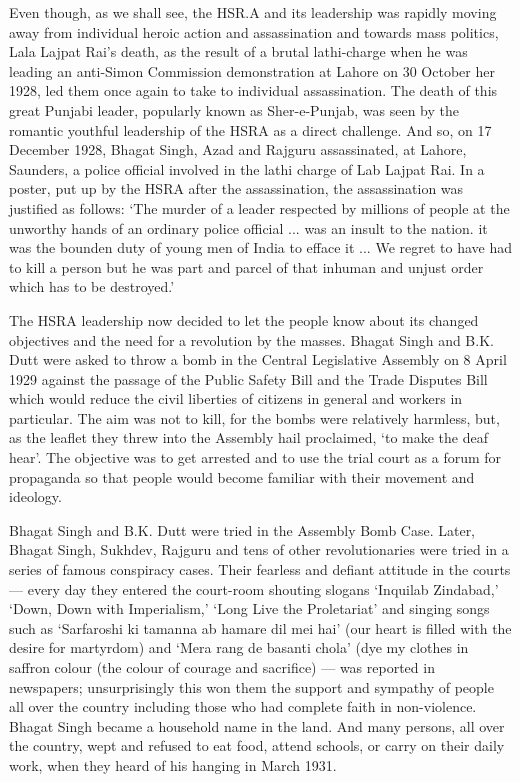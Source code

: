 Even though, as we shall see, the HSR.A and its leadership was rapidly moving away from individual heroic action and assassination and towards mass politics, Lala Lajpat Rai's death, as the result of a brutal lathi-charge when he was leading an anti-Simon Commission demonstration at Lahore on 30 October her 1928, led them once again to take to individual assassination. The death of this great Punjabi leader, popularly known as Sher-e-Punjab, was seen by the romantic youthful leadership of the HSRA as a direct challenge. And so, on 17 December 1928, Bhagat Singh, Azad and Rajguru assassinated, at Lahore, Saunders, a police official involved in the lathi charge of Lab Lajpat Rai. In a poster, put up by the HSRA after the assassination, the assassination was justified as follows: `The murder of a leader respected by millions of people at the unworthy hands of an ordinary police official ... was an insult to the nation. it was the bounden duty of young men of India to efface it ... We regret to have had to kill a person but he was part and parcel of that inhuman and unjust order which has to be destroyed.'

The HSRA leadership now decided to let the people know about its changed objectives and the need for a revolution by the masses. Bhagat Singh and B.K. Dutt were asked to throw a bomb in the Central Legislative Assembly on 8 April 1929 against the passage of the Public Safety Bill and the Trade Disputes Bill which would reduce the civil liberties of citizens in general and workers in particular. The aim was not to kill, for the bombs were relatively harmless, but, as the leaflet they threw into the Assembly hail proclaimed, `to make the deaf hear'. The objective was to get arrested and to use the trial court as a forum for propaganda so that people would become familiar with their movement and ideology.

Bhagat Singh and B.K. Dutt were tried in the Assembly Bomb Case. Later, Bhagat Singh, Sukhdev, Rajguru and tens of other revolutionaries were tried in a series of famous conspiracy cases. Their fearless and defiant attitude in the courts --- every day they entered the court-room shouting slogans `Inquilab Zindabad,' `Down, Down with Imperialism,' `Long Live the Proletariat' and singing songs such as `Sarfaroshi ki tamanna ab hamare dil mei hai' (our heart is filled with the desire for martyrdom) and `Mera rang de basanti chola' (dye my clothes in saffron colour (the colour of courage and sacrifice) --- was reported in newspapers; unsurprisingly this won them the support and sympathy of people all over the country including those who had complete faith in non-violence. Bhagat Singh became a household name in the land. And many persons, all over the country, wept and refused to eat food, attend schools, or carry on their daily work, when they heard of his hanging in March 1931.

